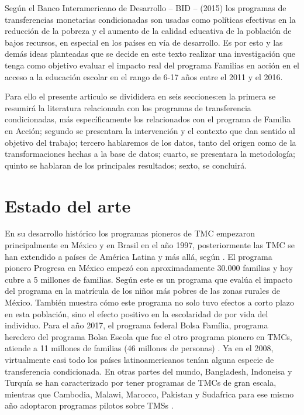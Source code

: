 \documentclass[AER]{AEA}
\begin{document}
Según el Banco Interamericano de Desarrollo – BID – (2015) los programas de transferencias monetarias condicionadas son usadas como políticas efectivas en la reducción de la pobreza y el aumento de la calidad educativa de la población de bajos recursos, en especial en los países en vía de desarrollo. Es por esto y las demás ideas planteadas que se decide en este texto realizar una investigación que tenga como objetivo evaluar el impacto real del programa Familias en acción en el acceso a la educación escolar en el rango de 6-17 años entre el 2011 y el 2016.

Para ello el presente articulo se divididera en seis secciones:en la primera se resumirá la literatura relacionada con los programas de transferencia condicionadas, más específicamente los relacionados con el programa de Familia en Acción; segundo se presentara la intervención y el contexto que dan sentido al objetivo del trabajo; tercero hablaremos de los datos, tanto del origen como de la transformaciones hechas a la base de datos; cuarto, se presentara la metodología; quinto se hablaran de los principales resultados; sexto, se concluirá.
      

\section{Estado del arte}

En su desarrollo histórico los programas pioneros de TMC empezaron principalmente en México y en Brasil en el año 1997, posteriormente las TMC se han extendido a países de América Latina y más allá, según \cite{Sugiyama2011TheAmericas}. El programa pionero Progresa en México empezó con aproximadamente 30.000 familias y hoy cubre a 5 millones de familias. Según \cite{Schultz2004SchoolProgram} este es un programa que evalúa el impacto del programa en la matrícula de los niños más pobres de las zonas rurales de México. También muestra cómo este programa no solo tuvo efectos a corto plazo en esta población, sino el efecto positivo en la escolaridad de por vida del individuo. Para el año 2017, el programa federal Bolsa Família, programa heredero del programa Bolsa Escola que fue el otro programa pionero en TMCs, atiende a 11 millones de familias (46 millones de personas) \citep{Fiszbein2009ConditionalReport}. Ya en el 2008, virtualmente casi todo los países latinoamericanos tenían alguna especie de transferencia condicionada. En otras partes del mundo, Bangladesh, Indoneisa y Turquía se han caracterizado por tener programas de TMCs de gran escala, mientras que Cambodia, Malawi, Marocco, Pakistan y Sudafrica para ese mismo año adoptaron programas pilotos sobre TMSs \citep{Fiszbein2009ConditionalReport}.
\end{document}

